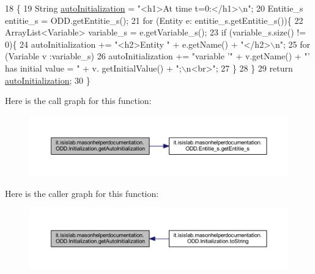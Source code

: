 \begin{DoxyCode}
18                                           \{
19         String \hyperlink{classit_1_1isislab_1_1masonhelperdocumentation_1_1_o_d_d_1_1_initialization_add84e104d84378945c02ac09899cb527}{autoInitialization} = \textcolor{stringliteral}{"<h1>At time t=0:</h1>\(\backslash\)n"};
20         Entitie\_s entitie\_s = ODD.getEntitie\_s();
21         \textcolor{keywordflow}{for} (Entity e: entitie\_s.getEntitie\_s())\{
22             ArrayList<Variable> variable\_s = e.getVariable\_s();     
23             \textcolor{keywordflow}{if} (variable\_s.size() != 0)\{
24                 autoInitialization += \textcolor{stringliteral}{"<h2>Entity "} + e.getName() + \textcolor{stringliteral}{"</h2>\(\backslash\)n"};
25                 \textcolor{keywordflow}{for} (Variable v :variable\_s)
26                     autoInitialization += \textcolor{stringliteral}{"variable '"} + v.getName() + \textcolor{stringliteral}{"' has initial value = "} + v.
      getInitialValue() + \textcolor{stringliteral}{";\(\backslash\)n<br>"};
27                 \}
28         \}
29         \textcolor{keywordflow}{return} \hyperlink{classit_1_1isislab_1_1masonhelperdocumentation_1_1_o_d_d_1_1_initialization_add84e104d84378945c02ac09899cb527}{autoInitialization};
30     \}
\end{DoxyCode}


Here is the call graph for this function\-:\nopagebreak
\begin{figure}[H]
\begin{center}
\leavevmode
\includegraphics[width=350pt]{classit_1_1isislab_1_1masonhelperdocumentation_1_1_o_d_d_1_1_initialization_a1702d60449cb3ad4eb1dc783d84c3b24_cgraph}
\end{center}
\end{figure}




Here is the caller graph for this function\-:\nopagebreak
\begin{figure}[H]
\begin{center}
\leavevmode
\includegraphics[width=350pt]{classit_1_1isislab_1_1masonhelperdocumentation_1_1_o_d_d_1_1_initialization_a1702d60449cb3ad4eb1dc783d84c3b24_icgraph}
\end{center}
\end{figure}


